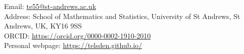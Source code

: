 \documentclass[11pt,a4paper]{article} %
\newcommand\vs{\vspace{-0.25cm}}
\begin{document}
 



\vspace{0.25cm}

\noindent Email: \href{mailto:te55@st-andrews.ac.uk}{te55@st-andrews.ac.uk} %
\\
Address: School of Mathematics and Statistics, University of St Andrews, St Andrews, UK, KY16 9SS %
\\ 
ORCID: \href{https://orcid.org/0000-0002-1910-2010}{https://orcid.org/0000-0002-1910-2010} \\
Personal webpage: \href{https://telsden.github.io/}{https://telsden.github.io/} \\

\vs

\spacedhrule{0.9em}{-0.4em} %


\end{document}
